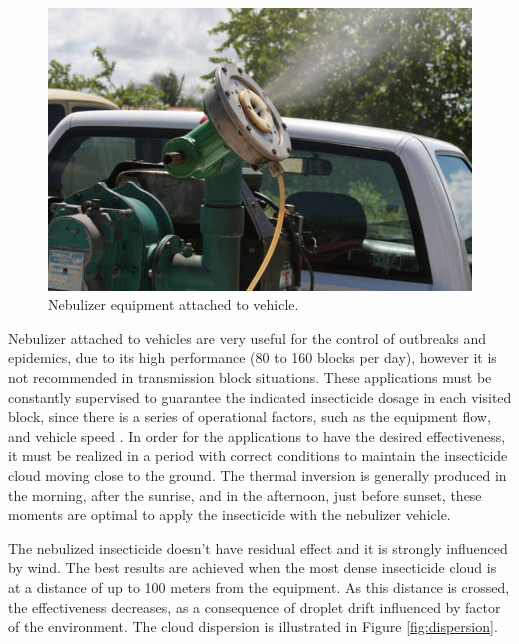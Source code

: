 \documentclass[a4paper,11pt]{article}
\begin{document}
\begin{figure}[!ht]
  \centering
    \includegraphics[scale=0.4]{fumace.jpg}
    \caption{Nebulizer equipment attached to vehicle. }
    \label{fig:nebulizer}
\end{figure}

Nebulizer attached to vehicles are very  useful for the control of outbreaks and
epidemics, due to its high performance (80 to 160 blocks per day), however it is
not recommended  in transmission  block situations.  These applications  must be
constantly  supervised to  guarantee the  indicated insecticide  dosage in  each
visited  block, since  there is  a series  of operational  factors, such  as the
equipment flow,  and vehicle speed \citep{brasil-dept-helth:2009}.  In order for
the applications  to have the  desired effectiveness, it  must be realized  in a
period with correct conditions to maintain the insecticide cloud moving close to
the ground.  The thermal inversion is  generally produced in the  morning, after
the sunrise, and in the afternoon, just before sunset, these moments are optimal
to apply the insecticide with the nebulizer vehicle.

The  nebulized insecticide  doesn't  have  residual effect  and  it is  strongly
influenced  by  wind.  The  best  results  are  achieved  when  the  most  dense
insecticide cloud is  at a distance of  up to 100 meters from  the equipment. As
this  distance is  crossed, the  effectiveness  decreases, as  a consequence  of
droplet drift influenced  by factor of the environment. The  cloud dispersion is
illustrated in Figure \ref{fig:dispersion}.
\end{document}
